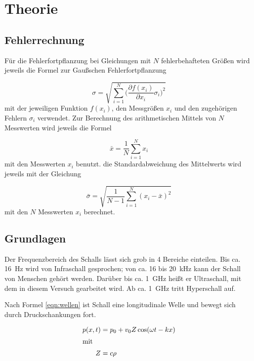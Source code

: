 \section{Theorie}
\label{sec:Theorie}

\subsection{Fehlerrechnung}

Für die Fehlerfortpflanzung bei Gleichungen mit $N$ fehlerbehafteten Größen
wird jeweils die Formel zur Gaußschen Fehlerfortpflanzung

\begin{equation}
  \sigma = \sqrt{\sum_{i=1}^{N}\biggl(\frac{\partial f(x_i)}{\partial x_i}
  \sigma_i\biggr)^2}
\end{equation}
mit der jeweiligen Funktion $f(x_i)$, den Messgrößen $x_i$ und den
zugehörigen Fehlern $\sigma_i$ verwendet.
Zur Berechnung des arithmetischen Mittels von $N$ Messwerten wird jeweils die
Formel

\begin{equation}
  \bar{x} = \frac{1}{N}\sum_{i=1}^{N}x_i
\end{equation}
mit den Messwerten $x_i$ benutzt.
die Standardabweichung des Mittelwerts wird jeweils mit der Gleichung

\begin{equation}
  \bar{\sigma} = \sqrt{\frac{1}{N-1}\sum_{i=1}^{N}(x_i - \bar{x})^2}
\end{equation}
mit den $N$ Messwerten $x_i$ berechnet.

\subsection{Grundlagen}

Der Frequenzbereich des Schalls lässt sich grob in 4 Bereiche einteilen.
Bis ca. \SI{16}{\hertz} wird von Infraschall gesprochen; von ca. 16 bis \SI{20}{\kilo\hertz}
kann der Schall von Menschen gehört werden. Darüber bis ca. \SI{1}{\giga\hertz}
heißt er Ultraschall, mit dem in diesem Versuch gearbeitet wird. Ab ca. \SI{1}{\giga\hertz}
tritt Hyperschall auf.

Nach Formel \eqref{eqn:wellen} ist Schall eine longitudinale Welle und bewegt sich
durch Druckschankungen fort.

\begin{align}
  p(x, t) &= p_0 + v_0 Z \cos(\omega t - k x)\\\label{eqn:wellen}
  \intertext{mit}
  Z &= c \rho \label{eqn:impedanz}
\end{align}


